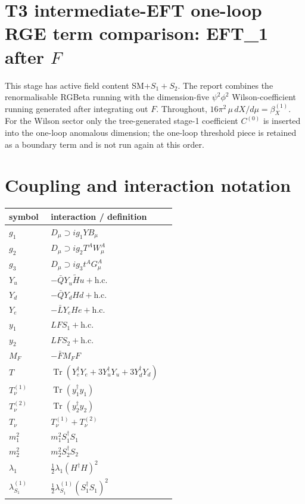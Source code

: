 \documentclass[8pt]{article}
\begin{document}
\begin{landscape}
\section*{T3 intermediate-EFT one-loop RGE term comparison: EFT\_1 after $F$}
This stage has active field content SM+$S_1+S_2$. The report combines the renormalisable RGBeta running with the dimension-five $\psi^2\phi^2$ Wilson-coefficient running generated after integrating out $F$.
\medskip
Throughout, $16\pi^2\,\mu\,dX/d\mu=\beta_X^{(1)}$. For the Wilson sector only the tree-generated stage-1 coefficient $C^{(0)}$ is inserted into the one-loop anomalous dimension; the one-loop threshold piece is retained as a boundary term and is not run again at this order.
\section*{Coupling and interaction notation}
\begin{longtable}{@{}p{0.23\linewidth}p{0.69\linewidth}@{}}
\toprule
symbol & interaction / definition \\
\midrule
$g_1$ & $D_\mu\supset i g_1YB_\mu$ \\
$g_2$ & $D_\mu\supset i g_2T^AW_\mu^A$ \\
$g_3$ & $D_\mu\supset i g_3t^AG_\mu^A$ \\
$Y_u$ & $-\bar QY_u\widetilde Hu+\mathrm{h.c.}$ \\
$Y_d$ & $-\bar QY_dHd+\mathrm{h.c.}$ \\
$Y_e$ & $-\bar LY_eHe+\mathrm{h.c.}$ \\
$y_1$ & $LFS_1+\mathrm{h.c.}$ \\
$y_2$ & $LFS_2+\mathrm{h.c.}$ \\
$M_F$ & $-\bar FM_FF$ \\
$T$ & $\operatorname{Tr}(Y_e^\dagger Y_e+3Y_u^\dagger Y_u+3Y_d^\dagger Y_d)$ \\
$T_\nu^{(1)}$ & $\operatorname{Tr}(y_1^\dagger y_1)$ \\
$T_\nu^{(2)}$ & $\operatorname{Tr}(y_2^\dagger y_2)$ \\
$T_\nu$ & $T_\nu^{(1)}+T_\nu^{(2)}$ \\
$m_1^2$ & $m_1^2S_1^\dagger S_1$ \\
$m_2^2$ & $m_2^2S_2^\dagger S_2$ \\
$\lambda_1$ & $\frac12\lambda_1(H^\dagger H)^2$ \\
$\lambda_{S_1}^{(1)}$ & $\frac12\lambda_{S_1}^{(1)}(S_1^\dagger S_1)^2$ \\

\end{longtable}
\end{landscape}
\end{document}
